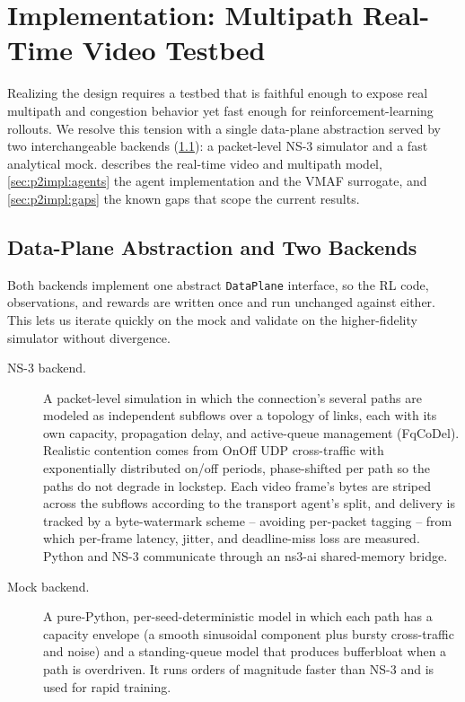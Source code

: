 \section{Implementation: Multipath Real-Time Video Testbed}
\label{sec:mp:impl}

Realizing the design requires a testbed that is faithful enough to expose real multipath and
congestion behavior yet fast enough for reinforcement-learning rollouts. We resolve this tension with a
single data-plane abstraction served by two interchangeable backends (\cref{sec:p2impl:dataplane}): a
packet-level NS-3 simulator and a fast analytical mock.  describes the real-time
video and multipath model, \cref{sec:p2impl:agents} the agent implementation and the VMAF surrogate, and
\cref{sec:p2impl:gaps} the known gaps that scope the current results.

\subsection{Data-Plane Abstraction and Two Backends}
\label{sec:p2impl:dataplane}

Both backends implement one abstract \texttt{DataPlane} interface, so the RL code, observations, and
rewards are written once and run unchanged against either. This lets us iterate quickly on the mock and
validate on the higher-fidelity simulator without divergence.

\begin{description}
  \item[NS-3 backend.] A packet-level simulation in which the connection's several paths are modeled as
  independent subflows over a topology of links, each with its own capacity, propagation delay, and
  active-queue management (FqCoDel). Realistic contention comes from OnOff UDP cross-traffic with
  exponentially distributed on/off periods, phase-shifted per path so the paths do not degrade in
  lockstep. Each video frame's bytes are striped across the subflows according to the transport agent's
  split, and delivery is tracked by a byte-watermark scheme -- avoiding per-packet tagging -- from which
  per-frame latency, jitter, and deadline-miss loss are measured. Python and NS-3 communicate through an
  ns3-ai shared-memory bridge.
  \item[Mock backend.] A pure-Python, per-seed-deterministic model in which each path has a capacity
  envelope (a smooth sinusoidal component plus bursty cross-traffic and noise) and a standing-queue model
  that produces bufferbloat when a path is overdriven. It runs orders of magnitude faster than NS-3 and is
  used for rapid training.
\end{description}

